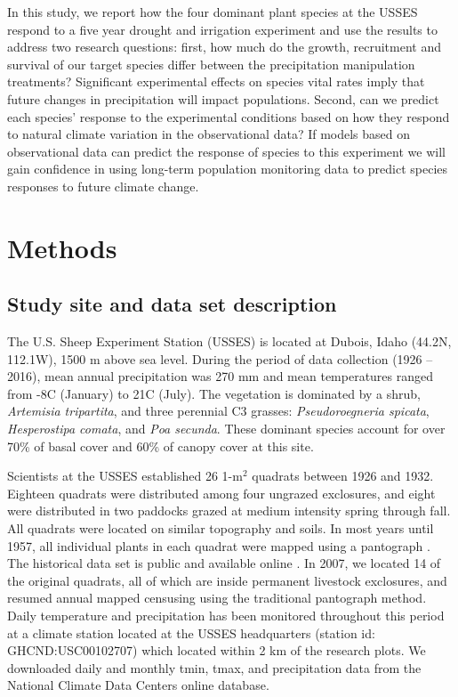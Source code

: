 \documentclass[11pt]{article}
\begin{document}
\begin{doublespacing}
In this study, we report how the four dominant plant species at the USSES respond to a five year drought and irrigation experiment and use the results to address two research questions: first, how much do the growth, recruitment and survival of our target species differ between the precipitation manipulation treatments? Significant experimental effects on species vital rates imply that future changes in precipitation will impact populations. Second, can we predict each species' response to the experimental conditions based on how they respond to natural climate variation in the observational data? If models based on observational data can predict the response of species to this experiment we will gain confidence in using long-term population monitoring data to predict species responses to future climate change. 

\section*{Methods}

\subsection*{Study site and data set description}

The U.S. Sheep Experiment Station (USSES) is located at Dubois, Idaho (44.2\degree N, 112.1\degree W), 1500 m above sea level. During the period of data collection (1926 – 2016), mean annual precipitation was 270 mm and mean temperatures ranged from -8\degree C (January) to 21\degree C (July). The vegetation is dominated by a shrub, \textit{Artemisia tripartita}, and three perennial C3 grasses: \textit{Pseudoroegneria spicata}, \textit{Hesperostipa comata}, and \textit{Poa secunda}. These dominant species account for over 70\% of basal cover and 60\% of canopy cover at this site. 

Scientists at the USSES established 26 1-m$^2$ quadrats between 1926 and 1932. Eighteen quadrats were distributed among four ungrazed exclosures, and eight were distributed in two paddocks grazed at medium intensity spring through fall. All quadrats were located on similar topography and soils. In most years until 1957, all individual plants in each quadrat were mapped using a pantograph \citep{blaisdell_seasonal_1958}. The historical data set is public and available online \citep{zachmann_mapped_2010}. In 2007, we located 14 of the original quadrats, all of which are inside permanent livestock exclosures, and resumed annual mapped censusing using the traditional pantograph method. Daily temperature and precipitation has been monitored throughout this period at a climate station located at the USSES headquarters (station id: GHCND:USC00102707) which located within 2 km of the research plots.  We downloaded daily and monthly tmin, tmax, and precipitation data from the National Climate Data Centers online database.  


\end{doublespacing}
\end{document}
